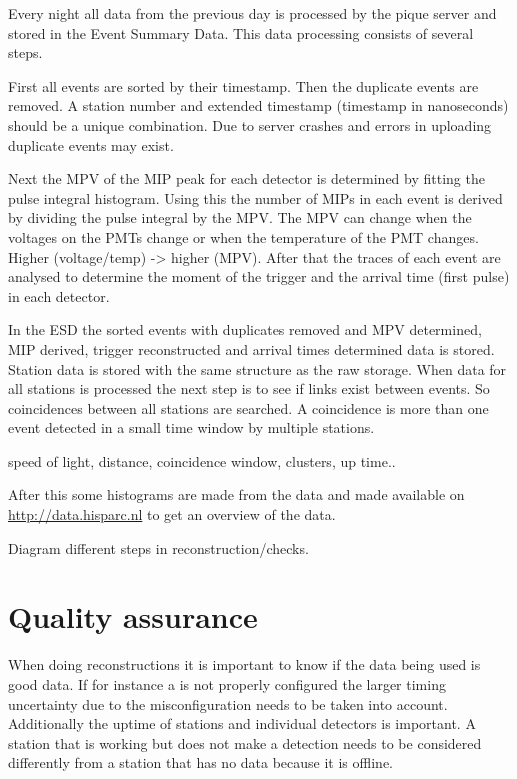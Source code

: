Every night all data from the previous day is processed by the pique
server and stored in the Event Summary Data. This data processing
consists of several steps.

First all events are sorted by their timestamp. Then the duplicate
events are removed. A station number and extended timestamp (timestamp
in nanoseconds) should be a unique combination. Due to server crashes
and errors in uploading duplicate events may exist.

Next the MPV of the MIP peak for each detector is determined by fitting
the pulse integral histogram. Using this the number of MIPs in each
event is derived by dividing the pulse integral by the MPV. The MPV can
change when the voltages on the PMTs change or when the temperature of
the PMT changes. Higher (voltage/temp) -> higher (MPV). After that the
traces of each event are analysed to determine the moment of the trigger
and the arrival time (first pulse) in each detector.

In the ESD the sorted events with duplicates removed and MPV determined,
MIP derived, trigger reconstructed and arrival times determined data is
stored. Station data is stored with the same structure as the raw
storage. When data for all stations is processed the next step is to see
if links exist between events. So coincidences between all stations are
searched. A coincidence is more than one event detected in a small time
window by multiple stations.

speed of light, distance, coincidence window, clusters, up time..

After this some histograms are made from the data and made available on
\url{http://data.hisparc.nl} to get an overview of the data.

Diagram different steps in reconstruction/checks.


\section{Quality assurance}

When doing reconstructions it is important to know if the data being used is good data. If for instance a \gps is not properly
configured the larger timing uncertainty due to the misconfiguration
needs to be taken into account. Additionally the uptime of stations and
individual detectors is important. A station that is working but does
not make a detection needs to be considered differently from a station
that has no data because it is offline.

